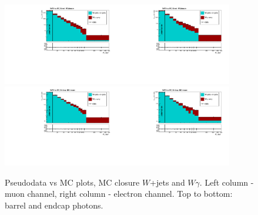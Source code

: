  \begin{figure}[htb]
  \begin{center}
   \includegraphics[width=0.45\textwidth]{../figs/figs_v11/MUON_WGamma/MCclosureWjetsPlusWg/c_TotalDATAvsMC_Barrel__phoEt_MCclosure.pdf}\includegraphics[width=0.45\textwidth]{../figs/figs_v11/ELECTRON_WGamma/MCclosureWjetsPlusWg/c_TotalDATAvsMC_Barrel__phoEt_MCclosure.pdf}
   \includegraphics[width=0.45\textwidth]{../figs/figs_v11/MUON_WGamma/MCclosureWjetsPlusWg/c_TotalDATAvsMC_Endcap__phoEt_MCclosure.pdf}\includegraphics[width=0.45\textwidth]{../figs/figs_v11/ELECTRON_WGamma/MCclosureWjetsPlusWg/c_TotalDATAvsMC_Endcap__phoEt_MCclosure.pdf}
  \caption{Pseudodata vs MC plots, MC closure $W$+jets and $W\gamma$. Left column - muon channel, right column - electron channel. Top to bottom: barrel and endcap photons.}
  \label{fig:DATAvsMC_MCclosureWjetsPlusWg}
  \end{center}
\end{figure}

